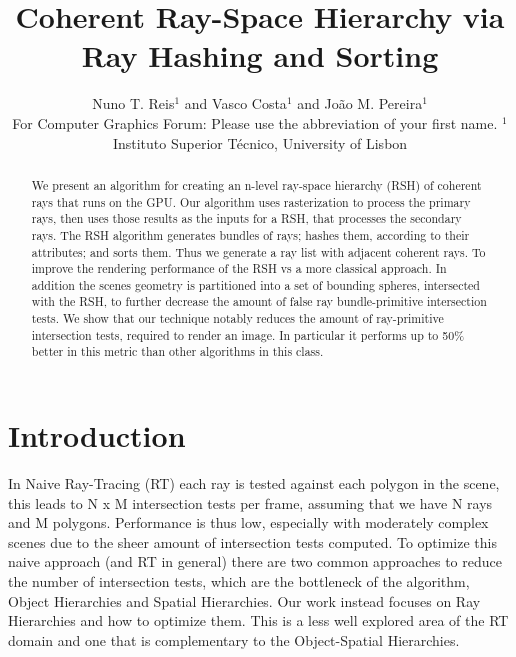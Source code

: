 \documentclass{egpubl}
\title[Coherent Ray-Space Hierarchy via Ray Hashing and Sorting]
      {Coherent Ray-Space Hierarchy via Ray Hashing and Sorting}
\author[Nuno T. Reis \& Vasco Costa \& Jo\~{a}o M. Pereira]
       {Nuno T. Reis$^{1}$
        and Vasco Costa$^{1}$
        and Jo\~{a}o M. Pereira$^{1}$
        \\
 For Computer Graphics Forum: Please use the abbreviation of your first name.
$^1$Instituto Superior T\'{e}cnico, University of Lisbon\\
       }
\begin{document}

\maketitle

\begin{abstract}

We present an algorithm for creating an n-level ray-space hierarchy (RSH) of coherent rays that runs on the GPU. Our algorithm uses rasterization to process the primary rays, then uses those results as the inputs for a RSH, that processes the secondary rays. The RSH algorithm generates bundles of rays; hashes them, according to their attributes; and sorts them. Thus we generate a ray list with adjacent coherent rays. To improve the rendering performance of the RSH vs a more classical approach. In addition the scenes geometry is partitioned into a set of bounding spheres, intersected with the RSH, to further decrease the amount of false ray bundle-primitive intersection tests. We show that our technique notably reduces the amount of ray-primitive intersection tests, required to render an image. In particular it performs up to 50\% better in this metric than other algorithms in this class.


\begin{classification} %
\end{classification}

\end{abstract}

\section{Introduction}

In Naive Ray-Tracing (RT) each ray is tested against each polygon in the scene, this leads to N x M intersection tests per frame, assuming that we have N rays and M polygons. Performance is thus low, especially with moderately complex scenes due to the sheer amount of intersection tests computed. To optimize this naive approach (and RT in general) there are two common approaches to reduce the number of intersection tests, which are the bottleneck of the algorithm, Object Hierarchies and Spatial Hierarchies. Our work instead focuses on Ray Hierarchies and how to optimize them. This is a less well explored area of the RT domain and one that is complementary to the Object-Spatial Hierarchies.
\end{document}
